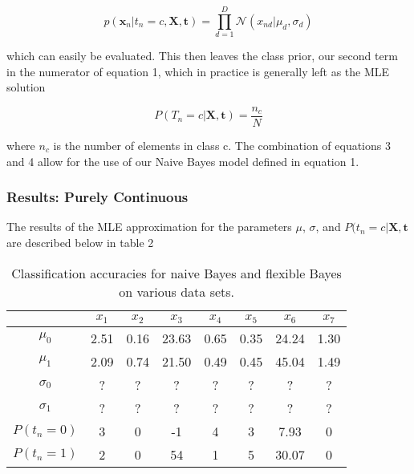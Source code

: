 \documentclass{article}
\begin{document}
\begin{equation}
    p(\textbf{x}_{n}|t_{n}=c,\textbf{X},\textbf{t})= \prod_{d=1}^D \mathcal{N}(x_{nd}|\mu_d, \sigma_d)
\end{equation}

which can easily be evaluated. This then leaves the class prior, our second term in the numerator of equation 1, which in practice is generally left as the MLE solution 

\begin{equation}
P(T_{n}=c|\textbf{X},\textbf{t})= \frac{n_c}{N}
\end{equation}

where $n_c$ is the number of elements in class c. The combination of equations 3 and 4 allow for the use of our Naive Bayes model defined in equation 1.

\subsubsection{Results: Purely Continuous}

The results of the MLE approximation for the parameters $\mu$, $\sigma$, and $P(t_n=c|\textbf{X},\textbf{t}$ are described below in table 2

\begin{table}[h]
\caption{Classification accuracies for naive Bayes and flexible 
Bayes on various data sets.}
\label{sample-table}
\vskip 0.15in
\begin{center}
\begin{small}
\begin{sc}
\begin{tabular}{|c|c|c|c|c|c|c|c|}
\hline
\abovespace\belowspace
  & $x_1$ & $x_2$ & $x_3$ & $x_4$ & $x_5$ & $x_6$ & $x_7$ \\
\hline
\abovespace
$\mu_0$ & 2.51 & 0.16 & 23.63 & 0.65 & 0.35 & 24.24 & 1.30 \\
$\mu_1$ & 2.09 & 0.74 & 21.50 & 0.49 & 0.45 & 45.04 & 1.49 \\
$\sigma_0$ & ? & ? & ? & ? & ? & ? & ? \\
$\sigma_1$ & ? & ? & ? & ? & ? & ? & ? \\
$P(t_n=0)$  & 3 & 0 & -1 & 4 & 3 & 7.93 & 0 \\
$P(t_n=1)$ & 2 & 0 & 54 & 1 & 5 & 30.07 & 0 \\

\hline
\end{tabular}
\end{sc}
\end{small}
\end{center}
\vskip -0.1in
\end{table}
\end{document}
